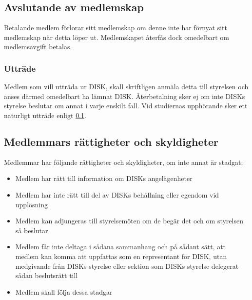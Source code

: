 	\subsection{Avslutande av medlemskap}
	\label{subsec:avslutandeavmedlemskap}
		Betalande medlem förlorar sitt medlemskap om denne inte har förnyat sitt medlemskap när detta löper ut. Medlemskapet återfås dock omedelbart om medlemsavgift betalas.

		\subsubsection{Utträde}
		\label{subsubsec:uttrade}
			Medlem som vill utträda ur DISK, skall skriftligen anmäla detta till styrelsen och anses därmed omedelbart ha lämnat DISK. Återbetalning sker ej om inte DISKs styrelse beslutar om annat i varje enskilt fall.
Vid studiernas upphörande sker ett naturligt utträde enligt \ref{subsec:avslutandeavmedlemskap}.

	\subsection{Medlemmars rättigheter och skyldigheter}
	\label{subsec:medlemmarsrattigheterochskyldigheter}
		Medlemmar har följande rättigheter och skyldigheter, om inte annat är stadgat:
		\begin{itemize}
		\setlength{\itemsep}{0.0cm}
		\setlength{\parskip}{0.0cm}
			\item Medlem har rätt till information om DISKs angelägenheter
			\item Medlem har inte rätt till del av DISKs behållning eller egendom vid upplösning
			\item Medlem kan adjungeras till styrelsemöten om de begär det och om styrelsen så beslutar
			\item Medlem får inte deltaga i sådana sammanhang och på sådant sätt, att medlem kan komma att uppfattas som en representant för DISK, utan medgivande från DISKs styrelse eller sektion som DISKs styrelse delegerat sådan beslutsrätt till
			\item Medlem skall följa dessa stadgar
		\end{itemize}
